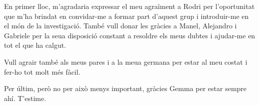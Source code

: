 \documentclass[../main.tex]{subfiles}
\begin{document}
En primer lloc, m'agradaria expressar el meu agraïment a Rodri per l'oportunitat que m'ha brindat en convidar-me a formar part d'aquest grup i introduir-me en el món de la investigació. També vull donar les gràcies a Manel, Alejandro i Gabriele per la seua disposició constant a resoldre els meus dubtes i ajudar-me en tot el que ha calgut.

Vull agrair també als meus pares i a la meua germana per estar al meu costat i fer-ho tot molt més fàcil.

Per últim, però no per això menys important, gràcies Gemma per estar sempre ahí. T'estime.
\end{document}
